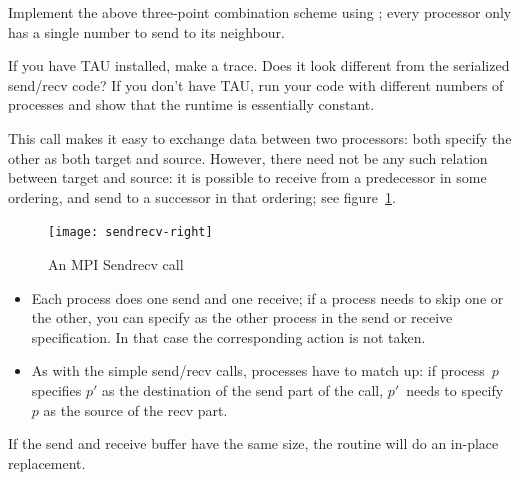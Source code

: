 \begin{exercise}
  \label{ex:3ptsendrecv}
  Implement the above three-point combination scheme using ;
  every processor only has a single number to send to its neighbour.

  If you have TAU installed, make a trace. Does it look different
  from the serialized send/recv code? If you don't have TAU, run your
  code with different numbers of processes and show that the runtime
  is essentially constant.
\end{exercise}

This call makes it easy to exchange data between two processors: both
specify the other as both target and source. However, there need not
be any such relation between target and source: it is possible to
receive from a predecessor in some ordering, and send to a successor
in that ordering; see figure~\ref{fig:sendrecv}.
\begin{figure}[ht]
  \texttt{[image: sendrecv-right]}
  \caption{An MPI Sendrecv call}
  \label{fig:sendrecv}
\end{figure}
\begin{itemize}
\item Each process does one send and one receive; if a process needs
  to skip one or the other, you can specify
   as the other process in the send or
  receive specification. In that case the corresponding action
  is not taken.
\item As with the simple send/recv calls, processes have to match up:
  if process~$p$ specifies $p'$ as the destination of the send part of
  the call, $p'$~needs to specify $p$ as the source of the recv part.
\end{itemize}

If the send and receive buffer have the same size, the routine
 will do an in-place replacement.


